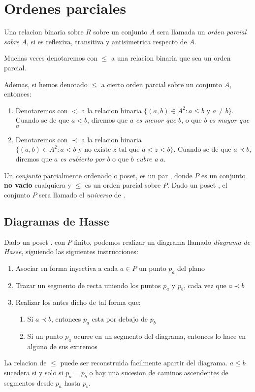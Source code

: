 
\section{Ordenes parciales}
\begin{definition}
  Una relacion binaria sobre $R$ sobre un conjunto $A$ sera llamada un \emph{orden parcial sobre} $A$,
  si es reflexiva, transitiva y antisimetrica respecto de $A$.
  
  Muchas veces denotaremos con $\leq$ a una relacion binaria que sea un orden parcial.

  Ademas, si hemos denotado $\leq$ a cierto orden parcial sobre un conjunto $A$, entonces:
  \begin{enumerate}
    \item Denotaremos con $<$ a la relacion binaria $\{(a, b) \in A^2 : a \leq b \text{ y } a \neq b\}$. Cuando se
    de que $a < b$, diremos que $a$ \emph{es menor que} $b$, o que $b$ \emph{es mayor que} $a$
    \item Denotaremos con $\prec$ a la relacion binaria $\{(a, b) \in A^2 : a < b \text{ y no existe $z$ tal que $a < z < b$}\}$.
    Cuando se de que $a \prec b$, diremos que $a$ \emph{es cubierto por} $b$ o que $b$ \emph{cubre a} $a$.
  \end{enumerate}
\end{definition}

\begin{definition}
  Un \emph{conjunto} parcialmente ordenado o poset, es un par \poset, donde $P$ es un conjunto \textbf{no vacio}
  cualquiera y $\leq$ es un orden parcial sobre $P$. Dado un poset \poset, el conjunto $P$ sera llamado el \emph{universo} de \poset.
\end{definition}

\subsection{Diagramas de Hasse}
Dado un poset \poset. con $P$ finito, podemos realizar un diagrama llamado \emph{diagrama de Hasse}, siguiendo las siguientes instrucciones:
\begin{enumerate}
  \item Asociar en forma inyectiva a cada $a \in P$ un punto $p_a$ del plano
  \item Trazar un segmento de recta uniendo los puntos $p_a$ y $p_b$, cada vez que $a \prec b$
  \item Realizar los antes dicho de tal forma que: \begin{enumerate}
    \item Si $a \prec b$, entonces $p_a$ esta por debajo de $p_b$
    \item Si un punto $p_a$ ocurre en un segmento del diagrama, entonces lo hace en alguno de sus extremos 
  \end{enumerate}
\end{enumerate}
La relacion de $\leq$ puede ser reconstruida facilmente apartir del diagrama. $a \leq b$ sucedera si y solo si
$p_a = p_b$ o hay una sucesion de caminos ascendentes de segmentos desde $p_a$ hasta $p_b$.

